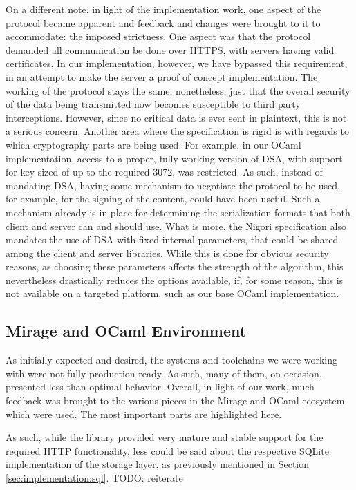 On a different note, in light of the implementation work, one aspect of the protocol became apparent and feedback and changes were brought to it to accommodate: the imposed strictness.
One aspect was that the protocol demanded all communication be done over HTTPS, with servers having valid certificates.
In our implementation, however, we have bypassed this requirement, in an attempt to make the server a proof of concept implementation.
The working of the protocol stays the same, nonetheless, just that the overall security of the data being transmitted now becomes susceptible to third party interceptions.
However, since no critical data is ever sent in plaintext, this is not a serious concern.
Another area where the specification is rigid is with regards to which cryptography parts are being used.
For example, in our OCaml implementation, access to a proper, fully-working version of DSA, with support for key sized of up to the required 3072, was restricted.
As such, instead of mandating DSA, having some mechanism to negotiate the protocol to be used, for example, for the signing of the content, could have been useful.
Such a mechanism already is in place for determining the serialization formats that both client and server can and should use.
What is more, the Nigori specification also mandates the use of DSA with fixed internal parameters, that could be shared among the client and server libraries.
While this is done for obvious security reasons, as choosing these parameters affects the strength of the algorithm, this nevertheless drastically reduces the options available, if, for some reason, this is not available on a targeted platform, such as our base OCaml implementation.

\subsection{Mirage and OCaml Environment}
As initially expected and desired, the systems and toolchains we were working with were not fully production ready.
As such, many of them, on occasion, presented less than optimal behavior.
Overall, in light of our work, much feedback was brought to the various pieces in the Mirage and OCaml ecosystem which were used.
The most important parts are highlighted here.

As such, while the  library provided very mature and stable support for the required HTTP functionality, less could be said about the respective SQLite implementation of the storage layer, as previously mentioned in Section \ref{sec:implementation:sql}. TODO: reiterate

